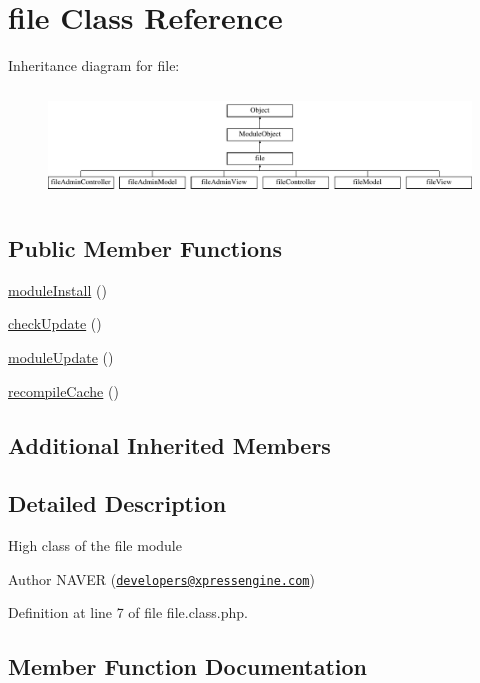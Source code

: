 \hypertarget{classfile}{}\section{file Class Reference}
\label{classfile}
Inheritance diagram for file\+:\begin{figure}[H]
\begin{center}
\leavevmode
\includegraphics[height=2.916667cm]{classfile}
\end{center}
\end{figure}
\subsection*{Public Member Functions}
\begin{DoxyCompactItemize}
\item 
\hyperlink{classfile_a5e8c34a5d2187f2a332a88e112c90bdc}{module\+Install} ()
\item 
\hyperlink{classfile_ad9420bb93d958cdd9741a27137f9cf2a}{check\+Update} ()
\item 
\hyperlink{classfile_a13a5d2858426d421327f744555fec4fb}{module\+Update} ()
\item 
\hyperlink{classfile_abdd4624fd45f101cdf4009eeda3cc1ab}{recompile\+Cache} ()
\end{DoxyCompactItemize}
\subsection*{Additional Inherited Members}


\subsection{Detailed Description}
High class of the file module \begin{DoxyAuthor}{Author}
N\+A\+V\+ER (\href{mailto:developers@xpressengine.com}{\tt developers@xpressengine.\+com}) 
\end{DoxyAuthor}


Definition at line 7 of file file.\+class.\+php.



\subsection{Member Function Documentation}
\mbox{\label{classfile_ad9420bb93d958cdd9741a27137f9cf2a}} 

